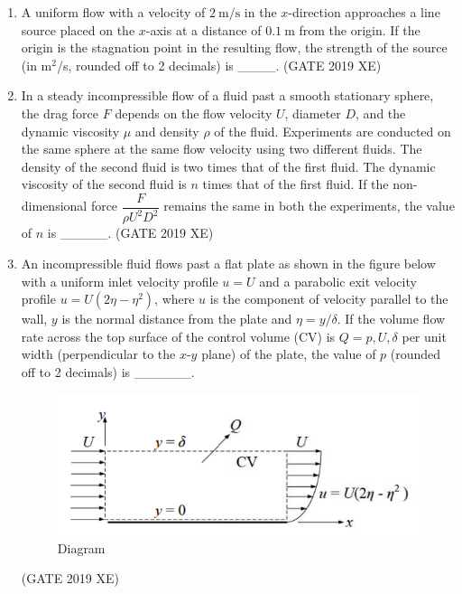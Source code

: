 \documentclass[journal,12pt,onecolumn]{IEEEtran}
\begin{document}
\begin{enumerate}
\item A uniform flow with a velocity of $2\ \mathrm{m/s}$ in the $x$-direction approaches a line source placed on the $x$-axis at a distance of $0.1\ \mathrm{m}$ from the origin. If the origin is the stagnation point in the resulting flow, the strength of the source (in m$^2$/s, rounded off to 2 decimals) is \_\_\_\_.
\hfill{(GATE 2019 XE)} \\


\item In a steady incompressible flow of a fluid past a smooth stationary sphere, the drag force $F$ depends on the flow velocity $U$, diameter $D$, and the dynamic viscosity $\mu$ and density $\rho$ of the fluid. Experiments are conducted on the same sphere at the same flow velocity using two different fluids. The density of the second fluid is two times that of the first fluid. The dynamic viscosity of the second fluid is $n$ times that of the first fluid. If the non-dimensional force $\dfrac{F}{\rho U^2 D^2}$ remains the same in both the experiments, the value of $n$ is \_\_\_\_\_.
\hfill{(GATE 2019 XE)} \\

\newpage

\item An incompressible fluid flows past a flat plate as shown in the figure below with a uniform inlet velocity profile $u=U$ and a parabolic exit velocity profile $u=U(2\eta - \eta^2)$, where $u$ is the component of velocity parallel to the wall, $y$ is the normal distance from the plate and $\eta=y/\delta$. If the volume flow rate across the top surface of the control volume (CV) is $Q=p,U,\delta$ per unit width (perpendicular to the $x$-$y$ plane) of the plate, the value of $p$ (rounded off to 2 decimals) is \_\_\_\_\_\_.

\begin{figure}[htbp]
  \centering
  \includegraphics[width=.7\columnwidth]{figs/B/fig4.png}
  \caption{Diagram}
  \label{fig:figs/B/fig4.png}
\end{figure}
\hfill{(GATE 2019 XE)} \\



\end{enumerate}
\end{document}
